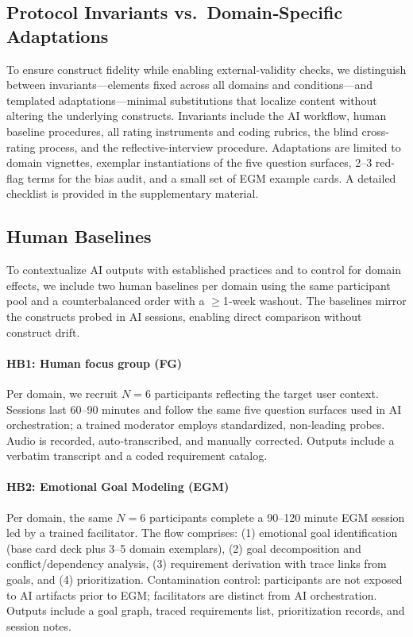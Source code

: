 \documentclass[acmsmall]{acmart}
\begin{document}
\subsection{Protocol Invariants vs.\ Domain‑Specific Adaptations}
\label{sec:invariants}
To ensure construct fidelity while enabling external-validity checks, we distinguish between invariants---elements fixed across all domains and conditions---and templated adaptations---minimal substitutions that localize content without altering the underlying constructs. Invariants include the AI workflow, human baseline procedures, all rating instruments and coding rubrics, the blind cross-rating process, and the reflective-interview procedure. Adaptations are limited to domain vignettes, exemplar instantiations of the five question surfaces, 2--3 red-flag terms for the bias audit, and a small set of EGM example cards. A detailed checklist is provided in the supplementary material.


\subsection{Human Baselines}
\label{sec:human-baselines}

To contextualize AI outputs with established practices and to control for domain effects, we include two human baselines per domain using the same participant pool and a counterbalanced order with a $\geq$1‑week washout. The baselines mirror the constructs probed in AI sessions, enabling direct comparison without construct drift.

\paragraph{HB1: Human focus group (FG)}
Per domain, we recruit $N{=}6$ participants reflecting the target user context. Sessions last 60--90 minutes and follow the same five question surfaces used in AI orchestration; a trained moderator employs standardized, non‑leading probes. Audio is recorded, auto‑transcribed, and manually corrected. Outputs include a verbatim transcript and a coded requirement catalog.

\paragraph{HB2: Emotional Goal Modeling (EGM)}
Per domain, the same $N{=}6$ participants complete a 90--120 minute EGM session led by a trained facilitator. The flow comprises: (1) emotional goal identification (base card deck plus 3--5 domain exemplars), (2) goal decomposition and conflict/dependency analysis, (3) requirement derivation with trace links from goals, and (4) prioritization. Contamination control: participants are not exposed to AI artifacts prior to EGM; facilitators are distinct from AI orchestration. Outputs include a goal graph, traced requirements list, prioritization records, and session notes.
\end{document}

